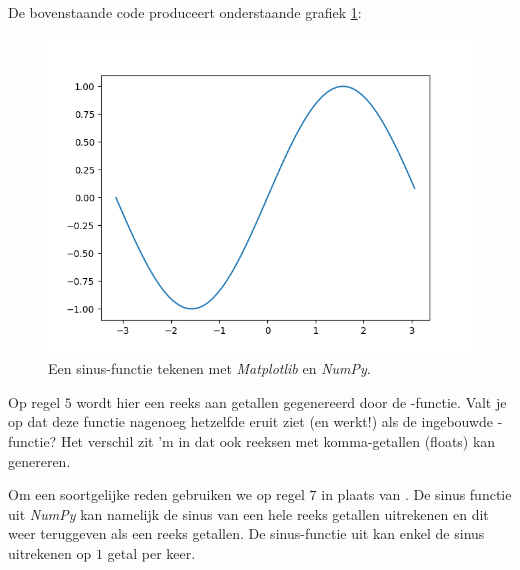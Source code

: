 De bovenstaande code produceert onderstaande grafiek \ref{fig:sinplot}:
\begin{figure}[!ht]
\centering\includegraphics[scale=0.7]{Pictures/chapter07/sin.png}
\caption{Een sinus-functie tekenen met \textit{Matplotlib} en \textit{NumPy}.}
\label{fig:sinplot} 
\end{figure}

Op regel $5$ wordt hier een reeks aan getallen gegenereerd door de -functie. Valt je op dat deze functie nagenoeg hetzelfde eruit ziet (en werkt!) als de ingebouwde -functie? Het verschil zit 'm in dat  ook reeksen met komma-getallen (floats) kan genereren. 

Om een soortgelijke reden gebruiken we op regel $7$  in plaats van . De sinus functie uit \textit{NumPy} kan namelijk de sinus van een hele reeks getallen uitrekenen en dit weer teruggeven als een reeks getallen. De sinus-functie uit  kan enkel de sinus uitrekenen op $1$ getal per keer.
 
\newpage


